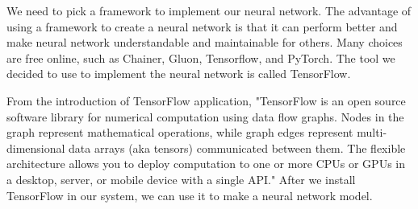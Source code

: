 \documentclass[onecolumn, draftclsnofoot,10pt, compsoc]{IEEEtran}
\begin{document}
\par
We need to pick a framework to implement our neural network. The advantage of using a framework to create a neural network is that it can perform better and make neural network understandable and maintainable for others. Many choices are free online, such as Chainer, Gluon, Tensorflow, and PyTorch. The tool we decided to use to implement the neural network is called TensorFlow.
\par
From the introduction of TensorFlow application, "TensorFlow is an open source software library for numerical computation using data flow graphs. Nodes in the graph represent mathematical operations, while graph edges represent multi-dimensional data arrays (aka tensors) communicated between them. The flexible architecture allows you to deploy computation to one or more CPUs or GPUs in a desktop, server, or mobile device with a single API." After we install TensorFlow in our system, we can use it to make a neural network model. 

\pagebreak
\end{document}
